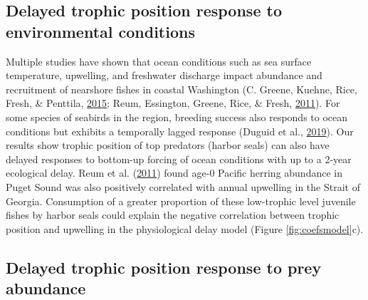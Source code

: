 \documentclass [11pt, proquest] {uwthesis}[2015/03/03]
\begin{document}
\subsection{Delayed trophic position response to environmental
conditions}\label{delayed-trophic-position-response-to-environmental-conditions}

Multiple studies have shown that ocean conditions such as sea surface
temperature, upwelling, and freshwater discharge impact abundance and
recruitment of nearshore fishes in coastal Washington (C. Greene,
Kuehne, Rice, Fresh, \& Penttila,
\protect\hyperlink{ref-Greene2015}{2015}; Reum, Essington, Greene, Rice,
\& Fresh, \protect\hyperlink{ref-Reum2011}{2011}). For some species of
seabirds in the region, breeding success also responds to ocean
conditions but exhibits a temporally lagged response (Duguid et al.,
\protect\hyperlink{ref-Duguid2019}{2019}). Our results show trophic
position of top predators (harbor seals) can also have delayed responses
to bottom-up forcing of ocean conditions with up to a 2-year ecological
delay. Reum et al. (\protect\hyperlink{ref-Reum2011}{2011}) found age-0
Pacific herring abundance in Puget Sound was also positively correlated
with annual upwelling in the Strait of Georgia. Consumption of a greater
proportion of these low-trophic level juvenile fishes by harbor seals
could explain the negative correlation between trophic position and
upwelling in the physiological delay model (Figure
\ref{fig:coefsmodel}c).

\subsection{Delayed trophic position response to prey
abundance}\label{delayed-trophic-position-response-to-prey-abundance}
\end{document}
